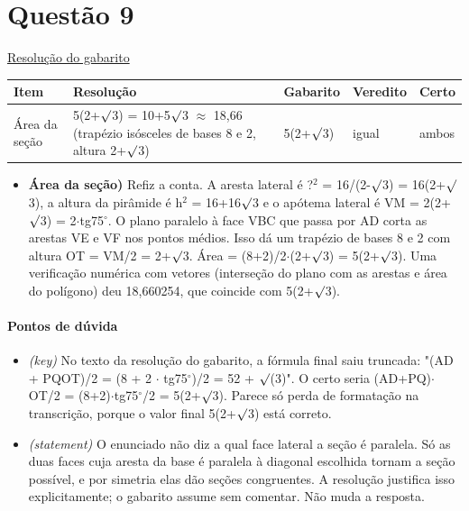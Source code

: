 \documentclass{article}%
\begin{document}
\section*{Questão 9}%
\href{https://poliedroresolve.sistemapoliedro.com.br/vestibulares/ita/2027/ita-2-fase-dia-1-20-10-2026-2-fase-dia-1/dissertativa-9-matematica-2-fase-dia-1-ita-2027}{Resolução do gabarito}\par\smallskip%
\begin{longtable}{@{}p{} p{} p{} p{} p{}@{}}\toprule Item & Resolução & Gabarito & Veredito & Certo \\ \midrule
Área da seção & 5(2+$\surd$3) = 10+5$\surd$3 $\approx$ 18,66 (trapézio isósceles de bases 8 e 2, altura 2+$\surd$3) & 5(2+$\surd$3) & igual & ambos \\
\bottomrule\end{longtable}%
\begin{itemize}%
\item%
\textbf{Área da seção)} Refiz a conta. A aresta lateral é ?$^2$ = 16/(2-$\surd$3) = 16(2+$\surd$3), a altura da pirâmide é h$^2$ = 16+16$\surd$3 e o apótema lateral é VM = 2(2+$\surd$3) = 2$\cdot$tg75$^\circ$. O plano paralelo à face VBC que passa por AD corta as arestas VE e VF nos pontos médios. Isso dá um trapézio de bases 8 e 2 com altura OT = VM/2 = 2+$\surd$3. Área = (8+2)/2$\cdot$(2+$\surd$3) = 5(2+$\surd$3). Uma verificação numérica com vetores (interseção do plano com as arestas e área do polígono) deu 18,660254, que coincide com 5(2+$\surd$3).%
\end{itemize}%
\paragraph{Pontos de dúvida}%
\begin{itemize}%
\item%
\textit{(key)} No texto da resolução do gabarito, a fórmula final saiu truncada: "(AD + PQOT)/2 = (8 + 2 $\cdot$ tg75$^\circ$)/2 = 52 + $\surd$(3)". O certo seria (AD+PQ)$\cdot$OT/2 = (8+2)$\cdot$tg75$^\circ$/2 = 5(2+$\surd$3). Parece só perda de formatação na transcrição, porque o valor final 5(2+$\surd$3) está correto.%
\item%
\textit{(statement)} O enunciado não diz a qual face lateral a seção é paralela. Só as duas faces cuja aresta da base é paralela à diagonal escolhida tornam a seção possível, e por simetria elas dão seções congruentes. A resolução justifica isso explicitamente; o gabarito assume sem comentar. Não muda a resposta.%
\end{itemize}%
\end{document}
